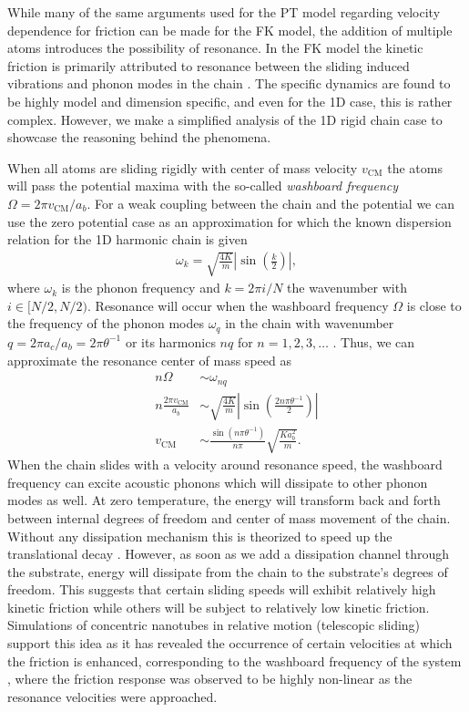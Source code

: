 While many of the same arguments used for the \acrshort{PT} model regarding velocity dependence for friction can be made for the \acrshort{FK} model, the addition of multiple atoms introduces the possibility of resonance. In the \acrshort{FK} model the kinetic friction is primarily attributed to resonance between the sliding induced vibrations and phonon modes in the chain \cite{FK2D}. The specific dynamics are found to be highly model and dimension specific, and even for the 1D case, this is rather complex. However, we make a simplified analysis of the 1D rigid chain case to showcase the reasoning behind the phenomena.

When all atoms are sliding rigidly with center of mass velocity $v_{{\text{CM}}}$ the atoms will pass the potential maxima with the so-called \textit{washboard frequency} $\Omega = 2\pi v_{{\text{CM}}} / a_b$. For a weak coupling between the chain and the potential we can use the zero potential case as an approximation for which the known dispersion relation for the 1D harmonic chain is given \cite[p. 92]{Kittel2004}
\begin{align*}
  \omega_k = \sqrt{\frac{4 K}{m}} \left|\sin{\left(\frac{k}{2}\right)}\right|,
\end{align*}
where $\omega_k$ is the phonon frequency and $k = 2\pi i / N$ the wavenumber with $i\in [N/2, N/2)$. Resonance will occur when the washboard frequency $\Omega$ is close to the frequency of the phonon modes $\omega_q$ in the chain with wavenumber $q = 2\pi a_c / a_b = 2\pi \theta^{-1}$ or its harmonics $nq$ for $n = 1, 2, 3, \hdots$ \cite{van_den_Ende_2012}. Thus, we can approximate the resonance center of mass speed as
\begin{align*}
    n \Omega &\sim \omega_{nq} \\
    n \frac{2\pi v_{\text{CM}}}{a_b} &\sim \sqrt{\frac{4K}{m}} \left| \sin{\left(\frac{2n \pi \theta^{-1}}{2}\right)}\right| \\
    v_{\text{CM}} &\sim \frac{\sin{(n\pi \theta^{-1})}}{n \pi} \sqrt{\frac{Ka_b^2}{m}}.
\end{align*}
When the chain slides with a velocity around resonance speed, the washboard
frequency can excite acoustic phonons which will dissipate to other phonon modes
as well. At zero temperature, the energy will transform back and forth between
internal degrees of freedom and center of mass movement of the chain. Without any dissipation mechanism this is theorized to speed up the translational decay \cite{FK2D}. However, as soon as we add a dissipation channel through the substrate, energy will dissipate from the chain to the substrate's degrees of freedom. This suggests that certain sliding speeds will exhibit relatively high kinetic friction while
others will be subject to relatively low kinetic friction. Simulations of
concentric nanotubes in relative motion (telescopic sliding) support this idea as it has revealed the
occurrence of certain velocities at which the friction is enhanced, corresponding
to the washboard frequency of the system \cite{Manini_2016}, where the friction response was observed to be highly non-linear as the resonance velocities were
approached. 

